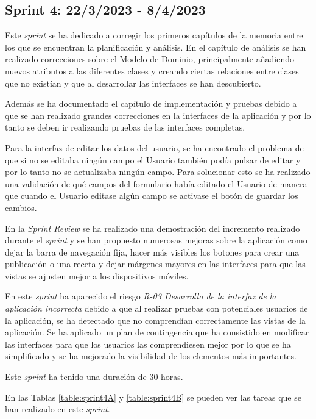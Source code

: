 \subsection{Sprint 4: 22/3/2023 - 8/4/2023}
Este \textit{sprint} se ha dedicado a corregir los primeros capítulos de la memoria entre los que se encuentran la planificación y análisis. En el capítulo de análisis se han realizado correcciones sobre el Modelo de Dominio, principalmente añadiendo nuevos atributos a las diferentes clases y creando ciertas relaciones entre clases que no existían y que al desarrollar las interfaces se han descubierto.

Además se ha documentado el capítulo de implementación y pruebas debido a que se han realizado grandes correcciones en la interfaces de la aplicación y por lo tanto se deben ir realizando pruebas de las interfaces completas.


Para la interfaz de editar los datos del usuario, se ha encontrado el problema de que si no se editaba ningún campo el Usuario también podía pulsar de editar y por lo tanto no se actualizaba ningún campo. Para solucionar esto se ha realizado una validación de qué campos del formulario había editado el Usuario de manera que cuando el Usuario editase algún campo se activase el botón de guardar los cambios.

En la \textit{Sprint Review} se ha realizado una demostración del incremento realizado durante el \textit{sprint} y se han propuesto numerosas mejoras sobre la aplicación como dejar la barra de navegación fija, hacer más visibles los botones para crear una publicación o una receta y dejar márgenes mayores en las interfaces para que las vistas se ajusten mejor a los dispositivos móviles.

En este \textit{sprint} ha aparecido el riesgo \textit{R-03 Desarrollo de la interfaz de la aplicación incorrecta} debido a que al realizar pruebas con potenciales usuarios de la aplicación, se ha detectado que no comprendían correctamente las vistas de la aplicación. Se ha aplicado un plan de contingencia que ha consistido en modificar las interfaces para que los usuarios las comprendiesen mejor por lo que se ha simplificado y se ha mejorado la visibilidad de los elementos más importantes.

Este \textit{sprint} ha tenido una duración de 30 horas.

En las Tablas \ref{table:sprint4A} y \ref{table:sprint4B} se pueden ver las tareas que se han realizado en este \textit{sprint}.

